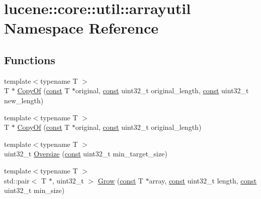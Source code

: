 \hypertarget{namespacelucene_1_1core_1_1util_1_1arrayutil}{}\section{lucene\+:\+:core\+:\+:util\+:\+:arrayutil Namespace Reference}
\label{namespacelucene_1_1core_1_1util_1_1arrayutil}
\subsection*{Functions}
\begin{DoxyCompactItemize}
\item 
{\footnotesize template$<$typename T $>$ }\\T $\ast$ \mbox{\hyperlink{namespacelucene_1_1core_1_1util_1_1arrayutil_a42793db2e08af25c01c19eb099ec7d1d}{Copy\+Of}} (\mbox{\hyperlink{ZlibCrc32_8h_a2c212835823e3c54a8ab6d95c652660e}{const}} T $\ast$original, \mbox{\hyperlink{ZlibCrc32_8h_a2c212835823e3c54a8ab6d95c652660e}{const}} uint32\+\_\+t original\+\_\+length, \mbox{\hyperlink{ZlibCrc32_8h_a2c212835823e3c54a8ab6d95c652660e}{const}} uint32\+\_\+t new\+\_\+length)
\item 
{\footnotesize template$<$typename T $>$ }\\T $\ast$ \mbox{\hyperlink{namespacelucene_1_1core_1_1util_1_1arrayutil_a5a4d6233afed538be3d004f5bd14375b}{Copy\+Of}} (\mbox{\hyperlink{ZlibCrc32_8h_a2c212835823e3c54a8ab6d95c652660e}{const}} T $\ast$original, \mbox{\hyperlink{ZlibCrc32_8h_a2c212835823e3c54a8ab6d95c652660e}{const}} uint32\+\_\+t original\+\_\+length)
\item 
{\footnotesize template$<$typename T $>$ }\\uint32\+\_\+t \mbox{\hyperlink{namespacelucene_1_1core_1_1util_1_1arrayutil_a88b54ef3001bf083cb1262383618c841}{Oversize}} (\mbox{\hyperlink{ZlibCrc32_8h_a2c212835823e3c54a8ab6d95c652660e}{const}} uint32\+\_\+t min\+\_\+target\+\_\+size)
\item 
{\footnotesize template$<$typename T $>$ }\\std\+::pair$<$ T $\ast$, uint32\+\_\+t $>$ \mbox{\hyperlink{namespacelucene_1_1core_1_1util_1_1arrayutil_a7776f2f4497c07c79bfd8767a3b505d0}{Grow}} (\mbox{\hyperlink{ZlibCrc32_8h_a2c212835823e3c54a8ab6d95c652660e}{const}} T $\ast$array, \mbox{\hyperlink{ZlibCrc32_8h_a2c212835823e3c54a8ab6d95c652660e}{const}} uint32\+\_\+t length, \mbox{\hyperlink{ZlibCrc32_8h_a2c212835823e3c54a8ab6d95c652660e}{const}} uint32\+\_\+t min\+\_\+size)

\end{DoxyCompactItemize}
